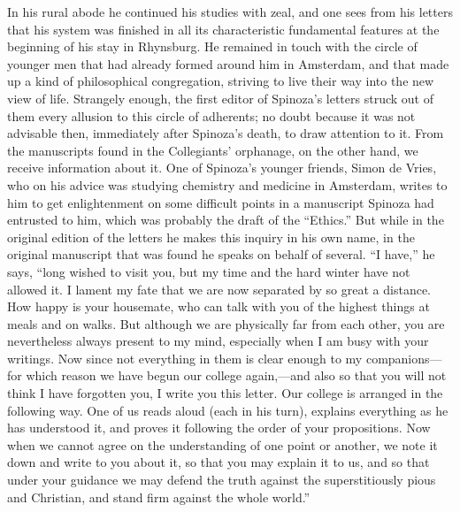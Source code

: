 \documentclass[12pt]{book}
\newcommand{\opage}[1]{\marginnote{\footnotesize\textit{[#1]}}}
\begin{document}
In his rural abode he continued his studies with zeal, and one sees from his letters
that his system was finished in all its characteristic fundamental features at the
beginning of his stay in Rhynsburg. He remained in touch with the circle of younger
men that had already formed around him in Amsterdam, and that made up a kind of
philosophical congregation, striving to live their way into the new view of life.
Strangely enough, the first editor of Spinoza's letters struck out of them every
allusion to this circle of adherents; no doubt because it was not advisable then,
immediately after Spinoza's death, to draw attention to it. From the manuscripts found
in the Collegiants' orphanage, on the other hand, we receive information about it. One
of Spinoza's younger friends, Simon \opage{29}de Vries, who on his advice was studying
chemistry and medicine in Amsterdam, writes to him to get enlightenment on some
difficult points in a manuscript Spinoza had entrusted to him, which was probably the
draft of the ``Ethics.'' But while in the original edition of the letters he makes
this inquiry in his own name, in the original manuscript that was found he speaks on
behalf of several. ``I have,'' he says, ``long wished to visit you, but my time and the
hard winter have not allowed it. I lament my fate that we are now separated by so
great a distance. How happy is your housemate, who can talk with you of the highest
things at meals and on walks. But although we are physically far from each other, you
are nevertheless always present to my mind, especially when I am busy with your
writings. Now since not everything in them is clear enough to my companions---for
which reason we have begun our college again,---and also so that you will not think I
have forgotten you, I write you this letter. Our college is arranged in the following
way. One of us reads aloud (each in his turn), explains everything as he has
understood it, and proves it following the order of your propositions. Now when we
cannot agree on the understanding of one point or another, we note it down and write
to you about it, so that you may explain it to us, and so that under your guidance we
may defend the truth against the superstitiously pious and Christian, and stand firm
against the whole world.''
\end{document}
